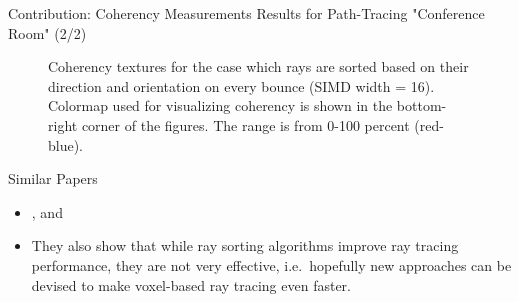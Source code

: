 \documentclass{beamer}
\begin{document}
\begin{frame}{Contribution: Coherency Measurements Results for Path-Tracing "Conference Room" (2/2)}
	\begin{figure}
		\centering
		\caption{Coherency textures for the case which rays are sorted based on their direction and orientation on every bounce (SIMD width = 16). Colormap used for visualizing coherency is shown in the bottom-right corner of the figures. The range is from 0-100 percent (red-blue).}
	\end{figure}
\end{frame}

\begin{frame}{Similar Papers}
	\begin{itemize}
		\item \cite{Barringer:2014:DRS:2601097.2601222}, and \cite{pgs.20141257}
		\item They also show that while ray sorting algorithms improve ray tracing performance, they are not very effective, i.e.~hopefully new approaches can be devised to make voxel-based ray tracing even faster.
	\end{itemize}
\end{frame}
\end{document}
